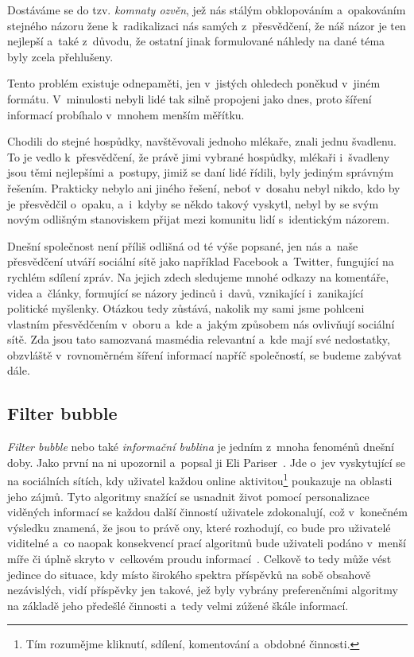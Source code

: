 \documentclass[12pt, a4paper]{article}
\numberwithin{equation}{section} 	%
\begin{document}
Dostáváme se do tzv. \textit{komnaty ozvěn}, jež nás stálým obklopováním a~opakováním stejného názoru žene k radikalizaci nás samých z přesvědčení, že náš názor je ten nejlepší a~také z důvodu, že ostatní jinak formulované náhledy na dané téma byly zcela přehlušeny.

Tento problém existuje odnepaměti, jen v jistých ohledech poněkud v jiném formátu. V minulosti nebyli lidé tak silně propojeni jako dnes, proto šíření informací probíhalo v mnohem menším měřítku.

Chodili do stejné hospůdky, navštěvovali jednoho mlékaře, znali jednu švadlenu. To je vedlo k přesvědčení, že právě jimi vybrané hospůdky, mlékaři i~švadleny jsou těmi nejlepšími a~postupy, jimiž se daní lidé řídili, byly jediným správným řešením. Prakticky nebylo ani jiného řešení, neboť v dosahu nebyl nikdo, kdo by je přesvědčil o~opaku, a~i~kdyby se někdo takový vyskytl, nebyl by se svým novým odlišným stanoviskem přijat mezi komunitu lidí s identickým názorem.

Dnešní společnost není příliš odlišná od té výše popsané, jen nás a~naše přesvědčení utváří sociální sítě jako například Facebook a~Twitter, fungující na rychlém sdílení zpráv.  Na jejich zdech sledujeme mnohé odkazy na komentáře, videa a~články, formující se názory jedinců i~davů, vznikající i~zanikající politické myšlenky. Otázkou tedy zůstává, nakolik my sami jsme pohlceni vlastním přesvědčením v oboru a~kde a~jakým způsobem nás ovlivňují sociální sítě.  Zda jsou tato samozvaná masmédia relevantní a~kde mají své nedostatky, obzvláště v rovnoměrném šíření informací napříč společností, se budeme zabývat dále.


\subsection{Filter bubble}
\noindent \textit{Filter bubble} nebo také \textit{informační bublina} je jedním z mnoha fenoménů dnešní doby. Jako první na ni upozornil a~popsal ji Eli Pariser~\cite{Pariser2011, PariserTed}. Jde o~jev vyskytující se na sociálních sítích, kdy uživatel každou online aktivitou\footnote{Tím rozumějme kliknutí, sdílení, komentování a~obdobné činnosti.} poukazuje na oblasti jeho zájmů. Tyto algoritmy snažící se usnadnit život pomocí personalizace viděných informací se každou další činností uživatele zdokonalují, což v konečném výsledku znamená, že jsou to právě ony, které rozhodují, co bude pro uživatelé viditelné a~co naopak konsekvencí prací algoritmů bude uživateli podáno v menší míře či úplně skryto v celkovém proudu informací~\cite{TheImpactOfFilterBubble}. Celkově to tedy může vést jedince do situace, kdy místo širokého spektra příspěvků na sobě obsahově nezávislých, vidí příspěvky jen takové, jež byly vybrány preferenčními algoritmy na základě jeho předešlé činnosti a~tedy velmi zúžené škále informací.
\end{document}
